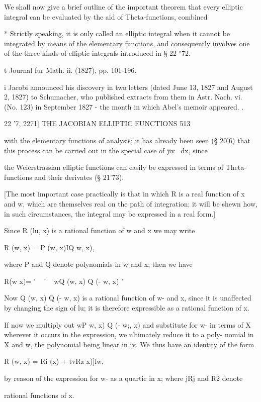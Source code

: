 We shall now give a brief outline of the important theorem that every
elliptic integral can be evaluated by the aid of Theta-functions,
combined

* Strictly speaking, it is only called an elliptic integral when it
cannot be integrated by means of the elementary functions, and
consequently involves one of the three kinds of elliptic integrals
introduced in § 22 "72.

t Journal fur Math. ii. (1827), pp. 101-196.

i Jacobi announced his discovery in two letters (dated June 13, 1827
and August 2, 1827) to Schumacher, who published extracts from them in
Astr. Nach. vi. (No. 123) in September 1827 - the month in which
Abel's memoir appeared. .

22 '7, 2271] THE JACOBIAN ELLIPTIC FUNCTIONS 513

with the elementary functions of analysis; it has already been seen
(§ 20'6) that this process can be carried out in the special case of
jiv~ dx, since

the Weierstrassian elliptic functions can easily be expressed in terms
of Theta-functions and their derivates (§ 21'73).

[The most important case practically is that in which R is a real
function of x and w, which are themselves real on the path of
integration; it will be shewn how, in such circumstances, the
integral may be expressed in a real form.]

Since R (lu, x) is a rational function of w and x we may write

R (w, x) = P (w, x)IQ w, x),

where P and Q denote polynomials in w and x; then we have

R(w x)= ' ~ ' ~ wQ (w, x) Q (- w, x) '

Now Q (w, x) Q (- w, x) is a rational function of w- and x, since it
is unaffected by changing the sign of lu; it is therefore expressible
as a rational function of x.

If now we multiply out wP w, x) Q (- w;, x) and substitute for w- in
terms of X wherever it occurs in the expression, we ultimately reduce
it to a poly- nomial in X and w, the polynomial being linear in iv. We
thus have an identity of the form

R (w, x) = Ri (x) + tvRz x)]lw,

by reason of the expression for w- as a quartic in x; where jRj and
R2 denote

rational functions of x.

